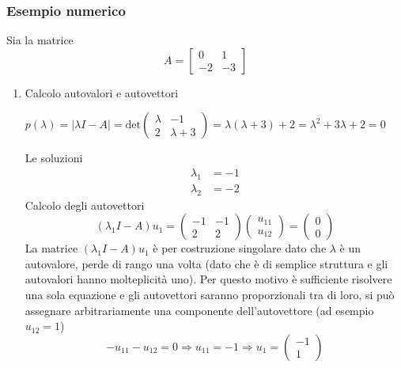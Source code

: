 \subsubsection{Esempio numerico}
Sia la matrice
$$
A = \begin{bmatrix}
    0 & 1 \\
    -2 & -3
    \end{bmatrix}
$$
\begin{enumerate}
\item Calcolo autovalori e autovettori

$p(\lambda) = |\lambda I -A| =
\text{det}\begin{pmatrix}
                                                \lambda & -1 \\
                                                2 & \lambda +3
                                                \end{pmatrix} =
\lambda(\lambda+3)+2 = \lambda^2 + 3\lambda +2 = 0$

Le soluzioni
$$
\begin{aligned}
\lambda_1 &= -1 \\
\lambda_2 &= -2
\end{aligned}
$$
Calcolo degli autovettori
$$
(\lambda_1 I -A)u_1 = \begin{pmatrix}
                        -1 & -1 \\
                        2 & 2
                        \end{pmatrix} \begin{pmatrix}
                                      u_{11} \\ u_{12}
                                      \end{pmatrix} = \begin{pmatrix}
                                      0 \\ 0
                                      \end{pmatrix}
$$
La matrice $ (\lambda_1 I -A)u_1$ è per costruzione singolare dato che
$\lambda$ è un autovalore, perde di rango una volta (dato che è di semplice
struttura e gli autovalori hanno molteplicità uno).
Per questo motivo è sufficiente risolvere una sola equazione e gli autovettori
saranno proporzionali tra di loro, si può assegnare arbitrariamente una
componente dell'autovettore (ad esempio $u_{12}=1$)
$$
- u_{11} - u_{12} = 0 \Rightarrow u_{11} = -1 \Rightarrow u_1 = \begin{pmatrix}
-1 \\ 1
\end{pmatrix}
$$


\end{enumerate}
